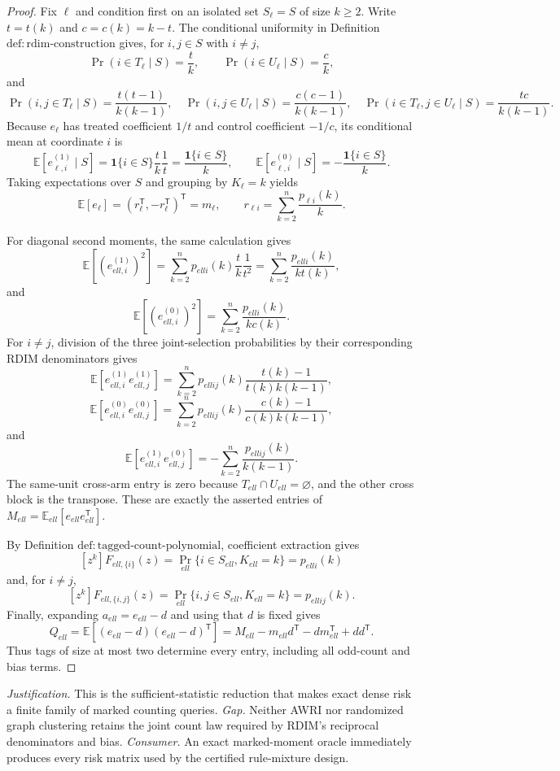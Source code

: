 \documentclass{article}
\begin{document}
\begin{proof}
Fix \(\ell\) and condition first on an isolated set \(S_{\ell}=S\) of size \(k\ge2\).  Write \(t=t(k)\) and \(c=c(k)=k-t\).  The conditional uniformity in Definition \(\mathrm{def:rdim\mbox{-}construction}\) gives, for \(i,j\in S\) with \(i\ne j\),
\[
 \Pr(i\in T_{\ell}\mid S)=\frac tk,
 \qquad
 \Pr(i\in U_{\ell}\mid S)=\frac ck,
\]
and
\[
 \Pr(i,j\in T_{\ell}\mid S)=\frac{t(t-1)}{k(k-1)},
 \quad
 \Pr(i,j\in U_{\ell}\mid S)=\frac{c(c-1)}{k(k-1)},
 \quad
 \Pr(i\in T_{\ell},j\in U_{\ell}\mid S)=\frac{tc}{k(k-1)}.
\]
Because \(e_{\ell}\) has treated coefficient \(1/t\) and control coefficient \(-1/c\), its conditional mean at coordinate \(i\) is
\[
 \mathbb E[e_{\ell,i}^{(1)}\mid S]
 =\mathbf 1\{i\in S\}\frac tk\frac1t
 =\frac{\mathbf 1\{i\in S\}}k,
 \qquad
 \mathbb E[e_{\ell,i}^{(0)}\mid S]
 =-\frac{\mathbf 1\{i\in S\}}k.
\]
Taking expectations over \(S\) and grouping by \(K_{\ell}=k\) yields
\[
 \mathbb E[e_{\ell}]
 =(r_{\ell}^{\mathsf T},-r_{\ell}^{\mathsf T})^{\mathsf T}
 =m_{\ell},
 \qquad
 r_{\ell i}=\sum_{k=2}^n\frac{p_{\ell i}(k)}k.
\]

For diagonal second moments, the same calculation gives
\[
 \mathbb E[(e_{ell,i}^{(1)})^2]
 =\sum_{k=2}^n p_{ell i}(k)\frac tk\frac1{t^2}
 =\sum_{k=2}^n\frac{p_{ell i}(k)}{k t(k)},
\]
and
\[
 \mathbb E[(e_{ell,i}^{(0)})^2]
 =\sum_{k=2}^n\frac{p_{ell i}(k)}{k c(k)}.
\]
For \(i\ne j\), division of the three joint-selection probabilities by their corresponding RDIM denominators gives
\[
 \mathbb E[e_{ell,i}^{(1)}e_{ell,j}^{(1)}]
 =\sum_{k=2}^n p_{ell ij}(k)
   \frac{t(k)-1}{t(k)k(k-1)},
\]
\[
 \mathbb E[e_{ell,i}^{(0)}e_{ell,j}^{(0)}]
 =\sum_{k=2}^n p_{ell ij}(k)
   \frac{c(k)-1}{c(k)k(k-1)},
\]
and
\[
 \mathbb E[e_{ell,i}^{(1)}e_{ell,j}^{(0)}]
 =-\sum_{k=2}^n\frac{p_{ell ij}(k)}{k(k-1)}.
\]
The same-unit cross-arm entry is zero because \(T_{ell}\cap U_{ell}=\varnothing\), and the other cross block is the transpose.  These are exactly the asserted entries of \(M_{ell}=\mathbb E_{ell}[e_{ell}e_{ell}^{\mathsf T}]\).

By Definition \(\mathrm{def:tagged\mbox{-}count\mbox{-}polynomial}\), coefficient extraction gives
\[
 [z^k]F_{ell,\{i\}}(z)
 =\Pr_{ell}\{i\in S_{ell},K_{ell}=k\}=p_{ell i}(k)
\]
and, for \(i\ne j\),
\[
 [z^k]F_{ell,\{i,j\}}(z)
 =\Pr_{ell}\{i,j\in S_{ell},K_{ell}=k\}=p_{ell ij}(k).
\]
Finally, expanding \(a_{ell}=e_{ell}-d\) and using that \(d\) is fixed gives
\[
 Q_{ell}
 =\mathbb E[(e_{ell}-d)(e_{ell}-d)^{\mathsf T}]
 =M_{ell}-m_{ell}d^{\mathsf T}-dm_{ell}^{\mathsf T}+dd^{\mathsf T}.
\]
Thus tags of size at most two determine every entry, including all odd-count and bias terms.
\end{proof}
\par\smallskip\noindent \textit{Justification.} This is the sufficient-statistic reduction that makes exact dense risk a finite family of marked counting queries. \textit{Gap.} Neither AWRI nor randomized graph clustering retains the joint count law required by RDIM's reciprocal denominators and bias. \textit{Consumer.} An exact marked-moment oracle immediately produces every risk matrix used by the certified rule-mixture design.
\end{document}
